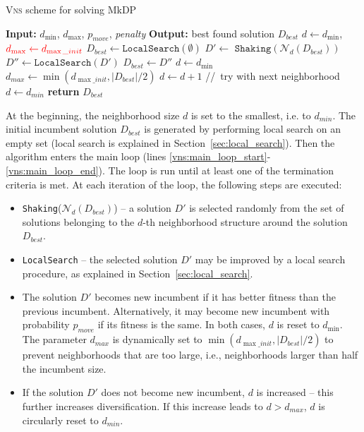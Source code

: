 \documentclass[dvipsnames,format=sigconf]{acmart} %
\begin{document}
     \begin{algorithm}[!t] 
     	\scriptsize
  	\caption{\textsc{Vns} scheme for solving MkDP}\label{alg:vns}
  	\begin{algorithmic}[1]
  		\STATE \textbf{Input:} $d_{\min}$, $d_{\max}$, $p_{move}$, \emph{penalty}
  		\STATE \textbf{Output:} best found solution $D_{best}$
  		\STATE $d \gets  d_{\min}$, $\textcolor{red}{d_{\max} \gets d_{\max\_init}}$
  		\STATE  $D_{best} \gets \texttt{LocalSearch}(\emptyset)$ \label{vns:init}
  		  \label{vns:main_loop_start}
  		\STATE  $D' \gets$  $\texttt{Shaking}(\mathcal{N}_d(D_{best}))$
  		\STATE $D'' \gets  \texttt{LocalSearch}(D')$
  		 \label{line:acceptance_incumbent_cond}
  	    \STATE $D _{best}\gets D''$
  	    \STATE $d \gets d_{\min}$
  	 	\STATE  $d_{max} \gets \min(d_{\max\_init}, |D_{best}|/2)$  \label{vns:implicit_bound}
  		\ELSE 
  		\STATE $d \gets d + 1$ \hspace{0.3cm}//\, try with next neighborhood
  		\STATE $d\gets d_{min}$
  		\ENDIF
  		\ENDIF
  		\ENDWHILE \label{vns:main_loop_end}
  		\STATE \textbf{return} $D_{best}$
  	\end{algorithmic}
  \end{algorithm}

  At the beginning, the neighborhood size $d$ is set to the smallest, i.e. to $d_{min}$. 
  The initial incumbent solution $D_{best}$ is generated by performing local search on an empty set (local search is explained in Section~\ref{sec:local_search}).  
  Then the algorithm enters the main loop (lines \ref{vns:main_loop_start}-\ref{vns:main_loop_end}). The loop is run until at least one of the termination criteria is met. At each iteration of the loop, the following steps are executed: 
  
  \begin{itemize}
  	\item \texttt{Shaking}($\mathcal{N}_d(D_{best})$) -- a solution $D'$ is selected   randomly from the set of solutions belonging to the $d$-th neighborhood structure around the solution $D_{best}$.
  	\item  \texttt{LocalSearch} -- the selected solution $D'$ may be improved by a local search procedure, as explained in Section~\ref{sec:local_search}.
  	\item The solution $D'$ becomes new incumbent if it has better fitness than the previous incumbent. Alternatively, it may become new incumbent with probability $p_{move}$ if its fitness is the same. In both cases, $d$ is reset to $d_{\min}$. The parameter $d_{max}$ is dynamically set to $\min(d_{\max\_init}, |D_{best}|/2)$ to prevent neighborhoods that are too large, i.e., neighborhoods larger than half  the incumbent size. 
  	\item  If the solution $D'$ does not become new incumbent, $d$ is increased -- this further increases diversification. If this increase leads to $d> d_{max}$, $d$ is circularly reset to $d_{min}$.
   \end{itemize}
    
\end{document}
